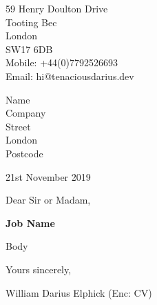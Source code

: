 \documentclass[11pt,letterpaper]{article}
\begin{document}
 
\begin{flushright} 
59 Henry Doulton Drive \\ 
Tooting Bec \\ 
London \\
SW17 6DB \\
Mobile: +44(0)7792526693 \\
Email: hi@tenaciousdarius.dev
\end{flushright}  
\begin{flushleft} 
Name \\ 
Company \\ 
Street \\ 
London \\
Postcode	
\end{flushleft} 
\begin{flushleft}
21st November 2019
\end{flushleft} 
\bigskip 
Dear Sir or Madam, 

{\bf Job Name} 

Body

Yours sincerely, 
\begin{figure}[h]
	\vspace{-10pt}
	\vspace{-20pt}
\end{figure}

William Darius Elphick\newline
(Enc: CV) 
\end{document}
